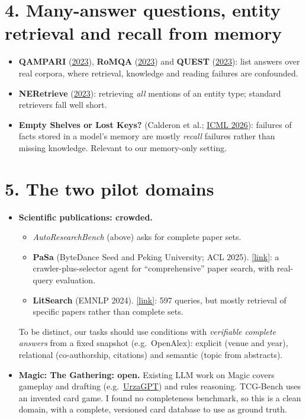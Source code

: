 \documentclass[10pt]{article}
\newcommand{\paper}[3]{\textbf{#1} \textnormal{(#2)}. \href{#3}{\small[link]}}
\begin{document}
\section*{4. Many-answer questions, entity retrieval and recall from memory}
\begin{itemize}
\item \textbf{QAMPARI} (\href{https://arxiv.org/abs/2205.12665}{2023}), \textbf{RoMQA}
(\href{https://arxiv.org/abs/2210.14353}{2023}) and \textbf{QUEST} (\href{https://arxiv.org/abs/2305.11694}{2023}):
list answers over real corpora, where retrieval, knowledge and reading failures are confounded.
\item \textbf{NERetrieve} (\href{https://arxiv.org/abs/2310.14282}{2023}): retrieving \emph{all} mentions of an
entity type; standard retrievers fall well short.
\item \textbf{Empty Shelves or Lost Keys?} (Calderon et al.; \href{https://proceedings.mlr.press/v306/calderon26a.html}{ICML
2026}): failures of facts stored in a model's memory are mostly \emph{recall} failures rather than missing
knowledge. Relevant to our memory-only setting.
\end{itemize}

\section*{5. The two pilot domains}
\begin{itemize}
\item \textbf{Scientific publications: crowded.}
  \begin{itemize}
  \item \emph{AutoResearchBench} (above) asks for complete paper sets.
  \item \paper{PaSa}{ByteDance Seed and Peking University; ACL 2025}{https://arxiv.org/abs/2501.10120}: a
  crawler-plus-selector agent for ``comprehensive'' paper search, with real-query evaluation.
  \item \paper{LitSearch}{EMNLP 2024}{https://arxiv.org/abs/2407.18940}: 597 queries, but mostly retrieval of
  specific papers rather than complete sets.
  \end{itemize}
  To be distinct, our tasks should use conditions with \emph{verifiable complete answers} from a fixed snapshot
  (e.g.\ OpenAlex): explicit (venue and year), relational (co-authorship, citations) and semantic (topic from
  abstracts).
\item \textbf{Magic: The Gathering: open.} Existing LLM work on Magic covers gameplay and drafting (e.g.\
\href{https://arxiv.org/abs/2508.08382}{UrzaGPT}) and rules reasoning. TCG-Bench uses an invented card game. I
found no completeness benchmark, so this is a clean domain, with a complete, versioned card database to use as
ground truth.
\end{itemize}
\end{document}
